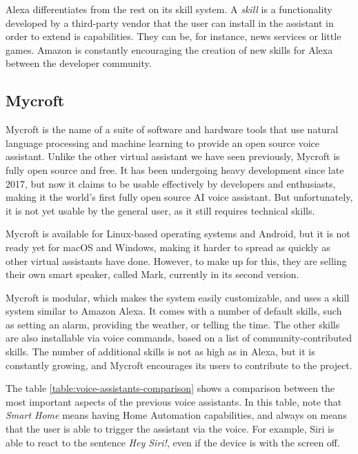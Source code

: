 Alexa differentiates from the rest on its skill system. A \textit{skill} is a functionality developed by a third-party vendor that the user
can install in the assistant in order to extend is capabilities. They can be, for instance, news services or little games. Amazon is
constantly encouraging the creation of new skills for Alexa between the developer community.\cite{amazonAlexa}

\subsection{Mycroft}
Mycroft is the name of a suite of software and hardware tools that use natural language processing and machine learning to provide
an open source voice assistant.\cite{mycroftDocumentation} Unlike the other virtual assistant we have seen previously, Mycroft is
fully open source and free. It has been undergoing heavy development since late 2017, but now it claims to be usable effectively
by developers and enthusiasts, making it the world's first fully open source AI voice assistant. But unfortunately, it is not yet usable
by the general user, as it still requires technical skills.

Mycroft is available for Linux-based operating systems and Android, but it is not ready yet for macOS and Windows, making it harder
to spread as quickly as other virtual assistants have done. However, to make up for this, they are selling their own smart speaker,
called Mark, currently in its second version.

Mycroft is modular, which makes the system easily customizable, and uses a skill system similar to Amazon Alexa. It comes with a
number of default skills, such as setting an alarm, providing the weather, or telling the time. The other skills are also installable via
voice commands, based on a list of community-contributed skills. The number of additional skills is not as high as in Alexa, but it
is constantly growing, and Mycroft encourages its users to contribute to the project.

\bigskip
The table \ref{table:voice-assistants-comparison} shows a comparison between the most important aspects of the previous voice
assistants. In this table, note that \textit{Smart Home} means having Home Automation capabilities, and always on means that the
user is able to trigger the assistant via the voice. For example, Siri is able to react to the sentence \textit{Hey Siri!}, even if the
device is with the screen off.

